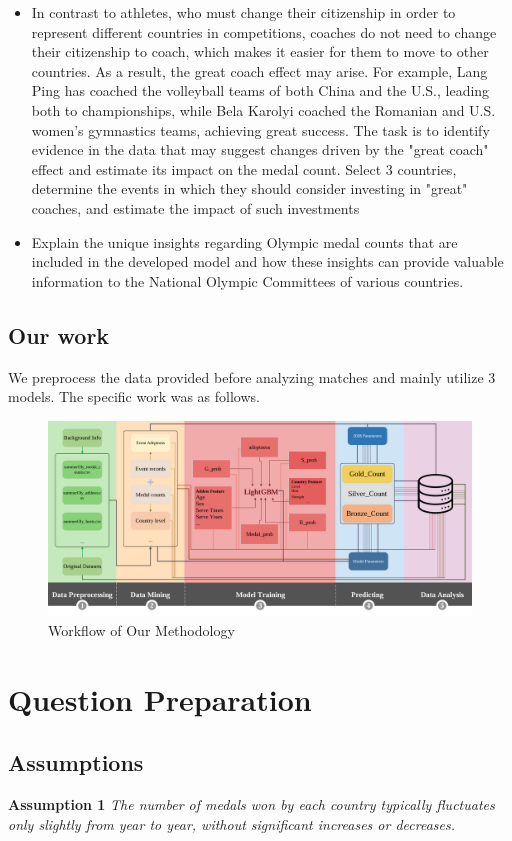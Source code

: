 \documentclass[12pt]{article}  %
\begin{document}
\begin{itemize}
	
	\item In contrast to athletes, who must change their citizenship in order to represent different countries in competitions, coaches do not need to change their citizenship to coach, which makes it easier for them to move to other countries. As a result, the great coach effect may arise. For example, Lang Ping has coached the volleyball teams of both China and the U.S., leading both to championships, while Bela Karolyi coached the Romanian and U.S. women’s gymnastics teams, achieving great success. The task is to identify evidence in the data that may suggest changes driven by the "great coach" effect and estimate its impact on the medal count. Select 3 countries, determine the events in which they should consider investing in "great" coaches, and estimate the impact of such investments
	\item Explain the unique insights regarding Olympic medal counts that are included in the developed model and how these insights can provide valuable information to the National Olympic Committees of various countries.

\end{itemize}

\subsection{Our work}
We preprocess the data provided before analyzing matches and mainly utilize 3 models. The specific work was as follows.
\begin{figure}[H]
	\centering
	\includegraphics[width=16cm]{img/da.png}
	\caption{Workflow of Our Methodology}
	\label{fig:aa}
\end{figure}


\section{Question Preparation}
\subsection{Assumptions}
\textbf{Assumption 1 } \textit{The number of medals won by each country typically fluctuates only slightly from year to year, without significant increases or decreases.}
\end{document}
